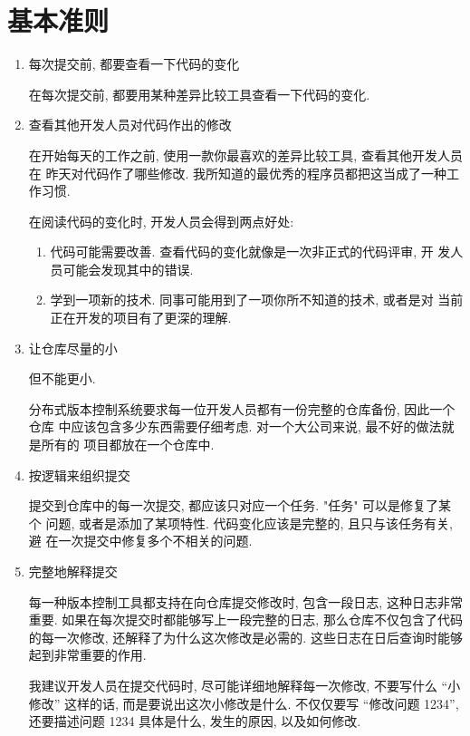 \documentclass[nofonts, oneside]{ctexart}
\begin{document}
\appendix
\section{基本准则}
\label{sec:basic_rules}
\begin{enumerate}
    \item 每次提交前, 都要查看一下代码的变化

    在每次提交前, 都要用某种差异比较工具查看一下代码的变化.

    \item 查看其他开发人员对代码作出的修改

    在开始每天的工作之前, 使用一款你最喜欢的差异比较工具, 查看其他开发人员在
    昨天对代码作了哪些修改. 我所知道的最优秀的程序员都把这当成了一种工作习惯.

    在阅读代码的变化时, 开发人员会得到两点好处:
    \begin{enumerate}
        \item 代码可能需要改善. 查看代码的变化就像是一次非正式的代码评审, 开
        发人员可能会发现其中的错误.
        \item 学到一项新的技术. 同事可能用到了一项你所不知道的技术, 或者是对
        当前正在开发的项目有了更深的理解.
    \end{enumerate}

    \item 让仓库尽量的小

    但不能更小.

    分布式版本控制系统要求每一位开发人员都有一份完整的仓库备份, 因此一个仓库
    中应该包含多少东西需要仔细考虑. 对一个大公司来说, 最不好的做法就是所有的
    项目都放在一个仓库中.

    \item 按逻辑来组织提交

    提交到仓库中的每一次提交, 都应该只对应一个任务. "任务" 可以是修复了某个
    问题, 或者是添加了某项特性. 代码变化应该是完整的, 且只与该任务有关, 避
    在一次提交中修复多个不相关的问题.

    \item 完整地解释提交

    每一种版本控制工具都支持在向仓库提交修改时, 包含一段日志, 这种日志非常
    重要. 如果在每次提交时都能够写上一段完整的日志, 那么仓库不仅包含了代码
    的每一次修改, 还解释了为什么这次修改是必需的. 这些日志在日后查询时能够
    起到非常重要的作用.

    我建议开发人员在提交代码时, 尽可能详细地解释每一次修改, 不要写什么 ``小
    修改'' 这样的话, 而是要说出这次小修改是什么. 不仅仅要写 ``修改问题 1234'',
    还要描述问题 1234 具体是什么, 发生的原因, 以及如何修改.


\end{enumerate}
\end{document}
